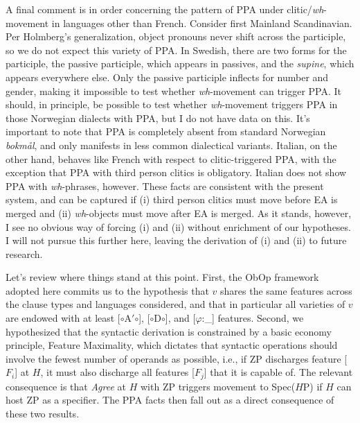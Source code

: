 \documentclass[11pt, letterpaper]{paper_nick}
\newcommand{\fm}[1]{[$\circ$#1$\circ$]}
\begin{document}

A final comment is in order concerning the pattern of PPA under clitic/\emph{wh}-movement in languages other than French. Consider first Mainland Scandinavian. Per Holmberg's generalization, object pronouns never shift across the participle, so we do not expect this variety of PPA. In Swedish, there are two forms for the participle, the passive participle, which appears in passives, and the \emph{supine}, which appears everywhere else. Only the passive participle inflects for number and gender, making it impossible to test whether \emph{wh}-movement can trigger PPA. It should, in principle, be possible to test whether \emph{wh}-movement triggers PPA in those Norwegian dialects with PPA, but I do not have data on this. It's important to note that PPA is completely absent from standard Norwegian \emph{bokm\r{a}l}, and only manifests in less common dialectical variants. Italian, on the other hand, behaves like French with respect to clitic-triggered PPA, with the exception that PPA with third person clitics is obligatory. Italian does not show PPA with \emph{wh}-phrases, however. These facts are consistent with the present system, and can be captured if (i) third person clitics must move before EA is merged and (ii) \emph{wh}-objects must move after EA is merged. As it stands, however, I see no obvious way of forcing (i) and (ii) without enrichment of our hypotheses. I will not pursue this further here, leaving the derivation of (i) and (ii) to future research.   

Let's review where things stand at this point. First, the ObOp framework adopted here commits us to the hypothesis that $v$ shares the same features across the clause types and languages considered, and that in particular all varieties of $v$ are endowed with at least \fm{A$'$}, \fm{D}, and [$\varphi$:\_] features. Second, we hypothesized that the syntactic derivation is constrained by a basic economy principle, Feature Maximality, which dictates that syntactic operations should involve the fewest number of operands as possible, i.e., if ZP discharges feature [$F_i$] at $H$, it must also discharge all features [$F_j$] that it is capable of. The relevant consequence is that \emph{Agree} at $H$ with ZP triggers movement to Spec($H$P) if $H$ can host ZP as a specifier. The PPA facts then fall out as a direct consequence of these two results. 
\end{document}
